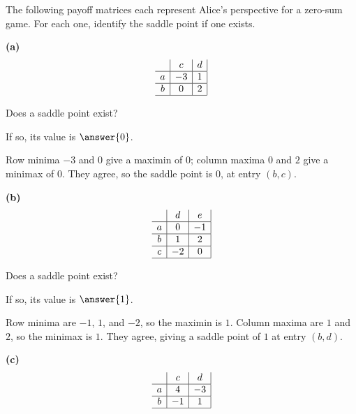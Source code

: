 \documentclass[12pt]{ximera}
\begin{document}
\begin{problem}
The following payoff matrices each represent Alice's perspective for a zero-sum game.
For each one, identify the saddle point if one exists.

\begin{prompt}
\textbf{(a)}
\[
\begin{array}{c|c|c|}
\phantom{|} & c & d \\\hline
a & -3 & 1 \\\hline
b & 0 & 2 \\\hline
\end{array}
\]

Does a saddle point exist?
\begin{multipleChoice}
\end{multipleChoice}

If so, its value is $\answer{0}$.

\begin{solution}
Row minima $-3$ and $0$ give a maximin of $0$; column maxima $0$ and $2$ give a
minimax of $0$. They agree, so the saddle point is $0$, at entry $(b,c)$.
\end{solution}
\end{prompt}

\begin{prompt}
\textbf{(b)}
\[
\begin{array}{c|c|c|}
\phantom{|} & d & e \\\hline
a & 0 & -1 \\\hline
b & 1 & 2 \\\hline
c & -2 & 0 \\\hline
\end{array}
\]

Does a saddle point exist?
\begin{multipleChoice}
\end{multipleChoice}

If so, its value is $\answer{1}$.

\begin{solution}
Row minima are $-1$, $1$, and $-2$, so the maximin is $1$. Column maxima are $1$ and
$2$, so the minimax is $1$. They agree, giving a saddle point of $1$ at entry
$(b,d)$.
\end{solution}
\end{prompt}

\begin{prompt}
\textbf{(c)}
\[
\begin{array}{c|c|c|}
\phantom{|} & c & d \\\hline
a & 4 & -3 \\\hline
b & -1 & 1 \\\hline
\end{array}
\]


\end{prompt}
\end{problem}
\end{document}
